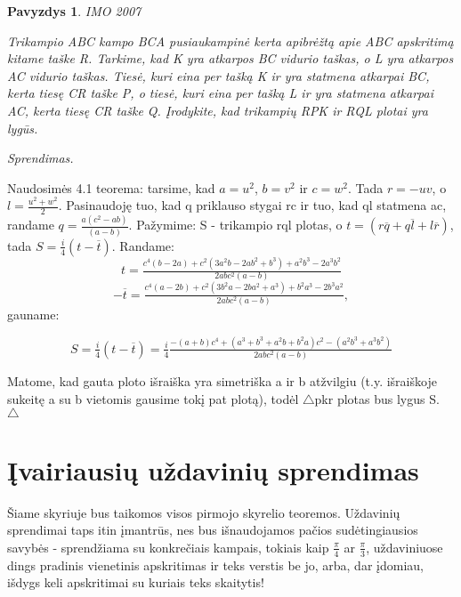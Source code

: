 \documentclass[11pt,a4paper,twoside]{book}
\newenvironment{sprendimas}{\noindent \textit{Sprendimas.}}{\hfill $\triangle$}
\newcounter{foo}[subsection]
\newtheorem{pavnr}[foo]{Pavyzdys}
\theoremstyle{definition} \newtheorem*{api}{Apibrėžimas}
\theoremstyle{remark} \newtheorem*{pastaba}{Pastaba}
\begin{document}
\begin{pavnr}

 IMO 2007

Trikampio ABC kampo BCA pusiaukampinė kerta apibrėžtą apie ABC apskritimą kitame taške R. Tarkime, kad K yra atkarpos BC vidurio taškas, o L yra atkarpos AC vidurio taškas. Tiesė, kuri eina per tašką K ir yra statmena atkarpai BC, kerta tiesę CR taške P, o tiesė, kuri eina per tašką L ir yra statmena atkarpai AC, kerta tiesę CR taške Q. Įrodykite, kad trikampių RPK ir RQL plotai yra lygūs.

\end{pavnr}
\begin{sprendimas}


Naudosimės 4.1 teorema: tarsime, kad $a=u^2$, $b=v^2$ ir $c=w^2$. Tada $r=-uv$, o $l=\tfrac{u^2+w^2}{2}$. Pasinaudoję tuo, kad q priklauso stygai rc ir tuo, kad ql statmena ac, randame $q=\tfrac{a(c^2 - ab)}{(a-b)}$. Pažymime: S - trikampio rql plotas, o $t=(r\overline{q} +q\overline{l}+l\overline{r})$, tada $S=\tfrac{i}{4}(t-\overline{t})$. Randame:
\begin{equation*}
t=\tfrac{c^4(b-2a) +c^2(3a^2b-2ab^2+b^3) +a^2b^3 - 2a^3b^2}{2abc^2(a-b)}
\end{equation*}
\begin{equation*}
-\overline{t}=\tfrac{c^4(a-2b) +c^2(3b^2a-2ba^2+a^3) +b^2a^3 - 2b^3a^2}{2abc^2(a-b)},
\end{equation*}gauname:

\begin{equation*}
S=\tfrac{i}{4}(t-\overline{t})=\tfrac{i}{4}\tfrac{-(a+b)c^4+(a^3+b^3+a^2b+b^2a)c^2-(a^2b^3+a^3b^2)}{2abc^2(a-b)}
\end{equation*}

Matome, kad gauta ploto išraiška yra simetriška a ir b atžvilgiu (t.y. išraiškoje sukeitę a su b vietomis gausime tokį pat plotą), todėl $\triangle$pkr plotas bus lygus S.
\end{sprendimas}

\chapter{Įvairiausių uždavinių sprendimas}

Šiame skyriuje bus taikomos visos pirmojo skyrelio teoremos. Uždavinių sprendimai taps
itin įmantrūs, nes bus išnaudojamos pačios sudėtingiausios savybės - sprendžiama
su konkrečiais kampais, tokiais kaip $\frac \pi 4$ ar $\frac \pi 3$, uždaviniuose
dings pradinis vienetinis apskritimas ir teks verstis be jo, arba, dar įdomiau, 
išdygs keli apskritimai su kuriais teks skaitytis!
\end{document}
